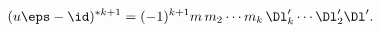 \begin{equation}
(u \eps -\id)^{*k+1} = (-1)^{k+1} m\,m_2 \cdots m_k\,
\Dl'_k \cdots \Dl'_2 \Dl'.
\label{eq:many-conv-bis}%
\end{equation}

